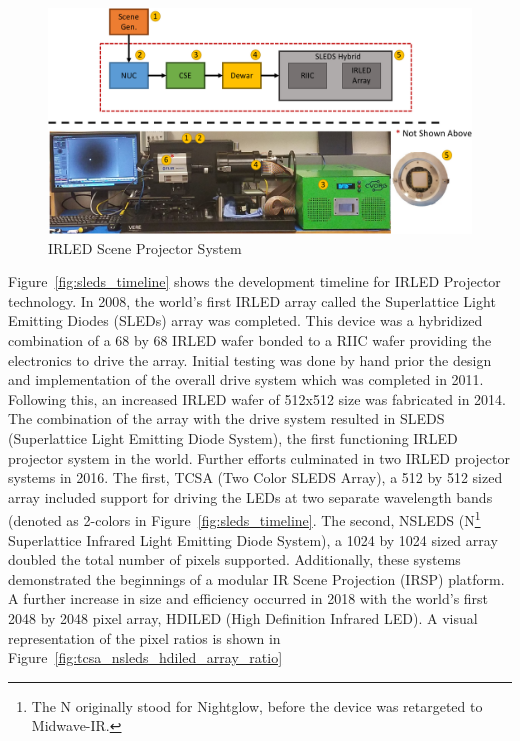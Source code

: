 \begin{figure}
    \centering
    \includegraphics[width=1.0\textwidth]{fig/sleds_system.pdf}
    \caption{IRLED Scene Projector System}
    \label{fig:sleds_system}
\end{figure}

Figure~\ref{fig:sleds_timeline} shows the development timeline for IRLED Projector technology. In 2008, the world's first IRLED array called the Superlattice Light Emitting Diodes (SLEDs) array was completed\cite{AhmedEtAl2019}. This device was a hybridized combination of a 68 by 68 IRLED wafer bonded to a RIIC wafer\cite{DasEtAl2009} providing the electronics to drive the array. Initial testing was done by hand prior the design and implementation of the overall drive system which was completed in 2011. Following this, an increased IRLED wafer of 512x512 size was fabricated in 2014\cite{NortonEtAl2013}. The combination of the array with the drive system resulted in SLEDS (Superlattice Light Emitting Diode System), the first functioning IRLED projector system in the world. Further efforts culminated in two IRLED projector systems in 2016. The first, TCSA (Two Color SLEDS Array), a 512 by 512 sized array\cite{McGeeEtAl2015, EjzakEtAl2016, EjzakEtAl2016_2, EjzakEtAl2017, RickerEtAl2017} included support for driving the LEDs at two separate wavelength bands (denoted as 2-colors in Figure~\ref{fig:sleds_timeline}. The second, NSLEDS (N\footnote{The N originally stood for Nightglow, before the device was retargeted to Midwave-IR.} Superlattice Infrared Light Emitting Diode System), a 1024 by 1024 sized array\cite{BenedictEtAl2017,AhmedEtAl2020} doubled the total number of pixels supported. Additionally, these systems demonstrated the beginnings of a modular IR Scene Projection (IRSP) platform\cite{BrowningEtAl2019}. A further increase in size and efficiency occurred in 2018 with the world's first 2048 by 2048 pixel array, HDILED (High Definition Infrared LED)\cite{BenedictEtAl2018}. A visual representation of the pixel ratios is shown in Figure~\ref{fig:tcsa_nsleds_hdiled_array_ratio}

